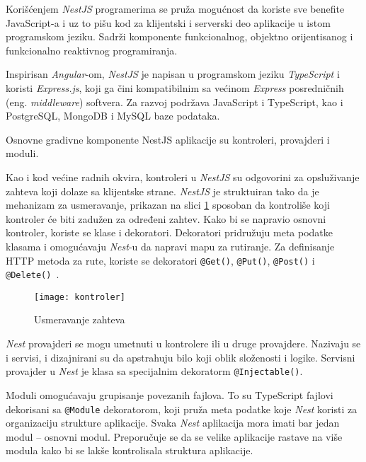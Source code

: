 Korišćenjem \textit{NestJS} programerima se pruža mogućnost da koriste sve benefite JavaScript-a i uz
to pišu kod za klijentski i serverski deo aplikacije u istom programskom jeziku. Sadrži komponente 
funkcionalnog, objektno orijentisanog i funkcionalno reaktivnog programiranja.

Inspirisan \textit{Angular}-om, \textit{NestJS} je napisan u programskom jeziku \textit{TypeScript} 
i koristi \textit{Express.js}, koji ga čini kompatibilnim sa većinom \textit{Express} posredničnih 
(eng. \textit{middleware}) softvera. Za razvoj podržava JavaScript i TypeScript, kao i PostgreSQL, 
MongoDB i MySQL baze podataka.

Osnovne gradivne komponente NestJS aplikacije su kontroleri, provajderi i moduli.

Kao i kod većine radnih okvira, kontroleri u \textit{NestJS} su odgovorini za opsluživanje zahteva koji dolaze
sa klijentske strane. \textit{NestJS} je struktuiran tako da je
mehanizam za usmeravanje, prikazan na slici \ref{fig:kontroler} sposoban da kontroliše koji kontroler 
će biti zadužen za određeni zahtev.
Kako bi se napravio osnovni kontroler, koriste se klase i dekoratori. Dekoratori pridružuju meta
podatke klasama i omogućavaju \textit{Nest}-u da napravi mapu za rutiranje. Za definisanje HTTP 
metoda za rute, koriste se dekoratori \texttt{@Get()}, \texttt{@Put()}, \texttt{@Post()} i \texttt{@Delete()}~\cite{nest}.

\begin{figure}[h]
    \centering
    \texttt{[image: kontroler]}
    \caption{Usmeravanje zahteva}
    \label{fig:kontroler}
\end{figure}
  
\textit{Nest} provajderi se mogu umetnuti u kontrolere ili u druge provajdere. Nazivaju se i servisi, 
i dizajnirani su da apstrahuju bilo koji oblik složenosti i logike.
Servisni provajder u \textit{Nest} je klasa sa specijalnim dekoratorm \texttt{@Injectable()}. 

Moduli omogućavaju grupisanje povezanih fajlova. To su TypeScript fajlovi dekorisani sa 
\texttt{@Module} dekoratorom, koji pruža meta podatke koje \textit{Nest} koristi za organizaciju 
strukture aplikacije. Svaka \textit{Nest} aplikacija mora imati bar jedan modul -- osnovni modul. 
Preporučuje se da se velike aplikacije rastave na više modula kako bi se lakše kontrolisala 
struktura aplikacije.


